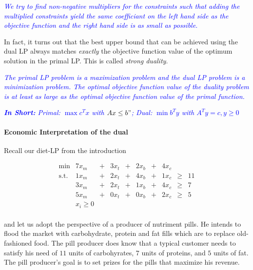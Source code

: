 \documentclass{article}
\begin{document}
\textcolor{blue}{\emph{We try to find non-negative multipliers for the constraints such that adding the multiplied constraints yield the same coefficiant on the left hand side as the objective function and the right hand side is as small as possible.}}

In fact, it turns out that the best upper bound that can be achieved using the dual LP always matches \emph{exactly} the objective function value of the optimum solution in the primal LP. This is called \emph{strong duality}.

\textcolor{blue}{\emph{The primal LP problem is a maximization problem and the dual LP problem is a minimization problem. The optimal objective function value of the duality problem is at least as large as the optimal objective function value of the primal function.}}

\textcolor{blue}{\emph{\textbf{In Short:} Primal: $\max c^Tx$ with $Ax \leq b"$; Dual: $\min b^Ty$ with $A^Ty = c, y \geq 0$}}

\paragraph*{Economic Interpretation of the dual}
Recall our diet-LP from the introduction

\[
\begin{matrix}
	\min	& 7 x_m	&+& 3 x_t&+& 2 x_b&+&4 x_c&&\\  
	\mbox{s.t.}	& 1 x_m &+& 2 x_t&+& 4 x_b&+&1 x_c&\geq&11\\
			& 3 x_m &+& 2 x_t&+& 1 x_b&+&4 x_c&\geq& 7\\
	           	& 5 x_m &+& 0 x_t&+& 0 x_b&+&2 x_c&\geq& 5\\
			& x_i\geq 0\\
\end{matrix}
\]

and let us adopt the perspective of a producer of nutriment pills. He intends to flood the market with carbohydrate, protein and fat fills which are to replace old-fashioned food. The pill producer does know that a typical customer needs to satisfy his need of $11$ units of carbohyrates, $7$ units of proteins, and $5$ units of fat. The pill producer's goal is to set prizes for the pills that maximize his revenue.
\end{document}
